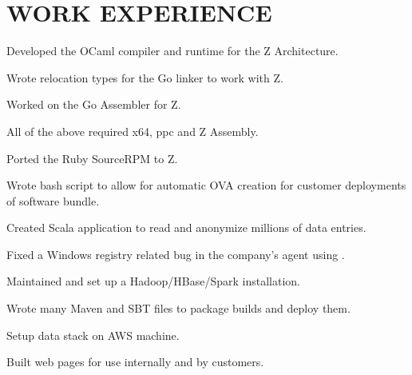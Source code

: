 \documentclass[letterpaper]{deedy-resume-modified} %
\begin{document}
\hfill
%
%
\begin{minipage}[t]{0.66\textwidth} %
\vspace{16pt}

\section{WORK EXPERIENCE}


\vspace{\topsep}
\begin{tightitemize}
\item Developed the OCaml compiler and runtime for the Z Architecture.
\item Wrote relocation types for the Go linker to work with Z.
\item Worked on the Go Assembler for Z.
\item All of the above required x64, ppc and Z Assembly.
\item Ported the Ruby SourceRPM to Z.
\end{tightitemize}

\sectionspace %



\begin{tightitemize}
\item Wrote bash script to allow for automatic OVA creation for customer deployments of software bundle.
\item Created Scala application to read and anonymize millions of data entries.
\item Fixed a Windows registry related bug in the company's agent using \CPP.
\item Maintained and set up a Hadoop/HBase/Spark installation.
\item Wrote many Maven and SBT files to package builds and deploy them.
\item Setup data stack on AWS machine.
\item Built web pages for use internally and by customers.
\end{tightitemize}


\end{minipage}
\end{document}

